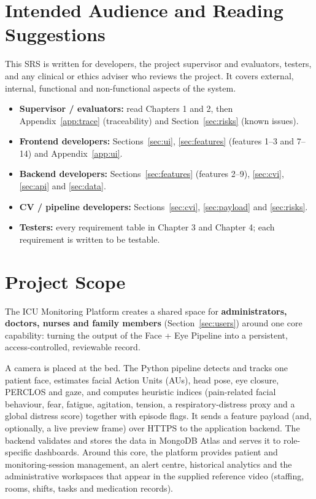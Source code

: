 \documentclass[a4paper,11pt]{scrreprt}
\begin{document}
\section{Intended Audience and Reading Suggestions}
This SRS is written for developers, the project supervisor and evaluators, testers, and any clinical or ethics adviser who reviews the project. It covers external, internal, functional and non-functional aspects of the system.
\begin{itemize}
  \item \textbf{Supervisor / evaluators:} read Chapters 1 and 2, then Appendix~\ref{app:trace} (traceability) and Section~\ref{sec:risks} (known issues).
  \item \textbf{Frontend developers:} Sections~\ref{sec:ui}, \ref{sec:features} (features 1--3 and 7--14) and Appendix~\ref{app:ui}.
  \item \textbf{Backend developers:} Sections~\ref{sec:features} (features 2--9), \ref{sec:cvi}, \ref{sec:api} and \ref{sec:data}.
  \item \textbf{CV / pipeline developers:} Sections~\ref{sec:cvi}, \ref{sec:payload} and \ref{sec:risks}.
  \item \textbf{Testers:} every requirement table in Chapter 3 and Chapter 4; each requirement is written to be testable.
\end{itemize}

\section{Project Scope}
The ICU Monitoring Platform creates a shared space for \textbf{administrators, doctors, nurses and family members} (Section~\ref{sec:users}) around one core capability: turning the output of the Face + Eye Pipeline into a persistent, access-controlled, reviewable record.

\medskip\noindent
A camera is placed at the bed. The Python pipeline detects and tracks one patient face, estimates facial Action Units (AUs), head pose, eye closure, PERCLOS and gaze, and computes heuristic indices (pain-related facial behaviour, fear, fatigue, agitation, tension, a respiratory-distress proxy and a global distress score) together with episode flags. It sends a feature payload (and, optionally, a live preview frame) over HTTPS to the application backend. The backend validates and stores the data in MongoDB Atlas and serves it to role-specific dashboards. Around this core, the platform provides patient and monitoring-session management, an alert centre, historical analytics and the administrative workspaces that appear in the supplied reference video (staffing, rooms, shifts, tasks and medication records).
\end{document}
